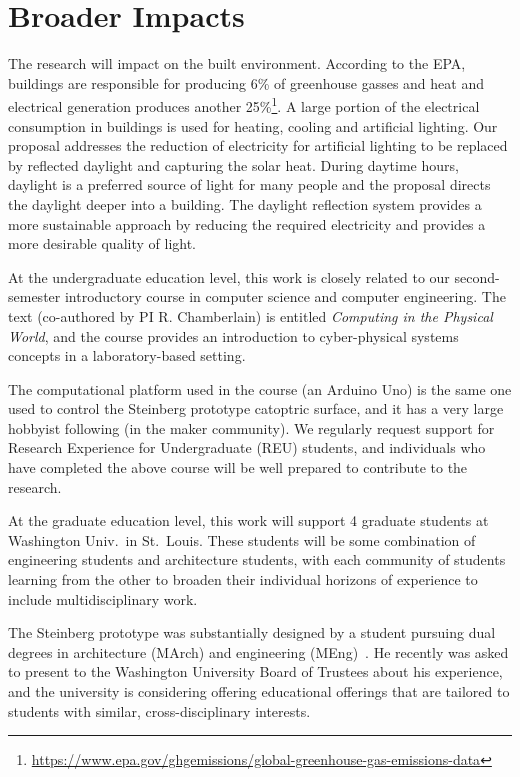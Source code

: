 \section{Broader Impacts}
\label{sec:broader}

The research will impact on the built environment.
According to the EPA, buildings are responsible for producing 6\% of
greenhouse gasses and heat and electrical generation produces another
25\%\footnote{\url{https://www.epa.gov/ghgemissions/global-greenhouse-gas-emissions-data}}.
A large portion of the electrical consumption in buildings is used for
heating, cooling and artificial lighting. Our proposal addresses the
reduction of electricity for artificial lighting to be replaced by
reflected daylight and capturing the solar heat. During daytime hours,
daylight is a preferred source of light for many people and the proposal
directs the daylight deeper into a building. The daylight reflection system
provides a more sustainable approach by reducing the required electricity
and provides a more desirable quality of light.

At the undergraduate education level, this work is closely related to
our second-semester introductory course in computer science and
computer engineering.  The
text (co-authored by PI R. Chamberlain) is entitled {\it Computing
in the Physical World}, and the course provides an introduction to
cyber-physical systems concepts in a laboratory-based setting.

The computational platform used in the course (an Arduino Uno) is the
same one used to control the Steinberg prototype catoptric surface,
and it has a very large hobbyist following (in the maker community).
We regularly request support for Research Experience for Undergraduate
(REU) students, and individuals who have completed
the above course will be well prepared to contribute to the research.

At the graduate education level, this work will support 4 graduate
students at Washington Univ.~in St.~Louis.
These students will be some combination of engineering students and
architecture students, with each community of students learning from
the other to broaden their individual horizons of experience to
include multidisciplinary work.

The Steinberg prototype was substantially designed by a student pursuing
dual degrees in architecture (MArch) and engineering (MEng)~\cite{Mitchell18}.
He recently was asked to present to the Washington University Board
of Trustees about his experience, and the university is considering
offering educational offerings that are tailored to students with
similar, cross-disciplinary interests.

